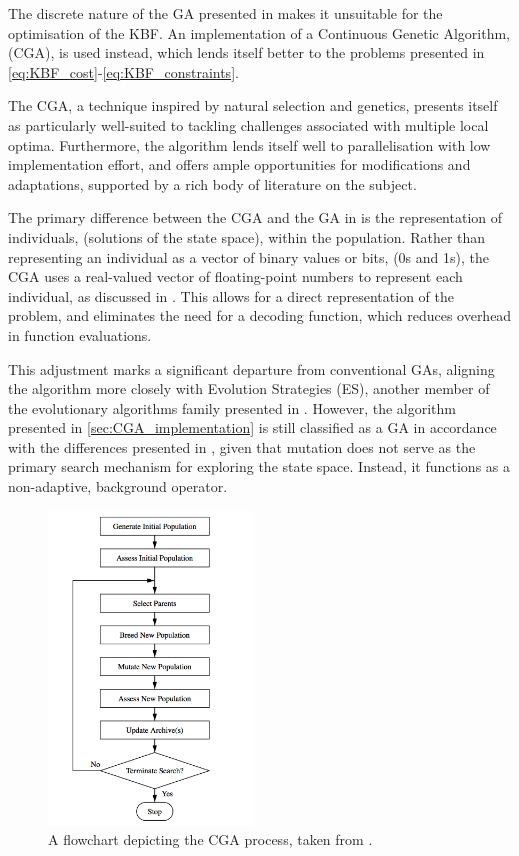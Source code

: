 \documentclass[10pt]{article}
\begin{document}
\begin{multicols}{2}
The discrete nature of the GA presented in \cite{parks2023geneticalgorithms} makes it unsuitable for the optimisation of the KBF. An implementation of a Continuous Genetic Algorithm, (CGA), is used instead, which lends itself better to the problems presented in \ref{eq:KBF_cost}-\ref{eq:KBF_constraints}.

The CGA, a technique inspired by natural selection and genetics, presents itself as particularly well-suited to tackling challenges associated with multiple local optima. Furthermore, the algorithm lends itself well to parallelisation with low implementation effort, and offers ample opportunities for modifications and adaptations, supported by a rich body of literature on the subject.

The primary difference between the CGA and the GA in \cite{parks2023geneticalgorithms} is the representation of individuals, (solutions of the state space), within the population. Rather than representing an individual as a vector of binary values or bits, (0s and 1s), the CGA uses a real-valued vector of floating-point numbers to represent each individual, as discussed in \cite{PGA}. This allows for a direct representation of the problem, and eliminates the need for a decoding function, which reduces overhead in function evaluations.

This adjustment marks a significant departure from conventional GAs, aligning the algorithm more closely with Evolution Strategies (ES), another member of the evolutionary algorithms family presented in \cite{salimans2017evolution}. However, the algorithm presented in \ref{sec:CGA_implementation} is still classified as a GA in accordance with the differences presented in \cite{10.1007/BFb0029787}, given that mutation does not serve as the primary search mechanism for exploring the state space. Instead, it functions as a non-adaptive, background operator.

\begin{figure}[H]
    \centering
    \includegraphics[width=0.48\textwidth]{../figures/Ungenerated Images/Flowchart.png}
    \captionsetup{justification=centering}
    \caption{A flowchart depicting the CGA process, taken from \cite{parks2023geneticalgorithms}.}
    \label{fig:GAprocess}
\end{figure}


\end{multicols}
\end{document}
